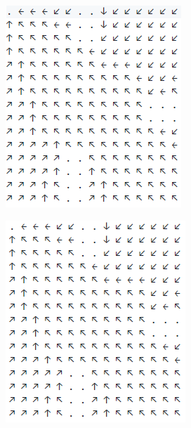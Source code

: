 \documentclass[12pt, a4paper]{article}
\begin{document}
\begin{figure}[h]
    \begin{subfigure}{0.45\linewidth}
        \centering
        \includegraphics[width=\linewidth]{images/q4/d/nocost/discount_09.png}
        \caption{}
    \end{subfigure}
    \hfill
    \begin{subfigure}{0.45\linewidth}
        \centering
        \includegraphics[width=\linewidth]{images/q4/d/nocost/discount_75.png}

\end{subfigure}
\end{figure}
\end{document}
